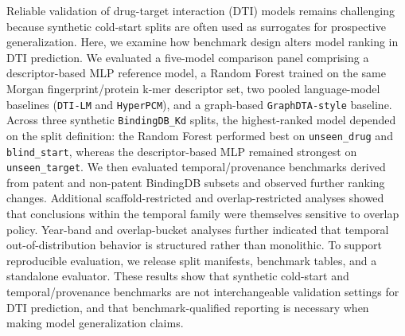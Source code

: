 Reliable validation of drug-target interaction (DTI) models remains challenging because synthetic cold-start splits are often used as surrogates for prospective generalization. Here, we examine how benchmark design alters model ranking in DTI prediction. We evaluated a five-model comparison panel comprising a descriptor-based MLP reference model, a Random Forest trained on the same Morgan fingerprint/protein k-mer descriptor set, two pooled language-model baselines (\texttt{DTI-LM} and \texttt{HyperPCM}), and a graph-based \texttt{GraphDTA-style} baseline. Across three synthetic \texttt{BindingDB\_Kd} splits, the highest-ranked model depended on the split definition: the Random Forest performed best on \texttt{unseen\_drug} and \texttt{blind\_start}, whereas the descriptor-based MLP remained strongest on \texttt{unseen\_target}. We then evaluated temporal/provenance benchmarks derived from patent and non-patent BindingDB subsets and observed further ranking changes. Additional scaffold-restricted and overlap-restricted analyses showed that conclusions within the temporal family were themselves sensitive to overlap policy. Year-band and overlap-bucket analyses further indicated that temporal out-of-distribution behavior is structured rather than monolithic. To support reproducible evaluation, we release split manifests, benchmark tables, and a standalone evaluator. These results show that synthetic cold-start and temporal/provenance benchmarks are not interchangeable validation settings for DTI prediction, and that benchmark-qualified reporting is necessary when making model generalization claims.
